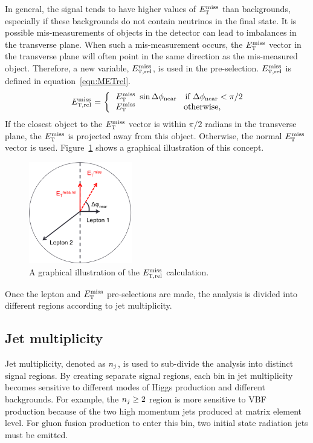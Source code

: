 In general, the signal tends to have higher values of $E_{\textrm{\footnotesize\sc t}}^{\rm miss}$ than backgrounds, especially if these backgrounds do not contain neutrinos in the final state. It is possible mis-measurements of objects in the detector can lead to imbalances in the transverse plane. When such a mis-measurement occurs, the $E_{\textrm{\footnotesize\sc t}}^{\rm miss}$ vector in the transverse plane will often point in the same direction as the mis-measured object. Therefore, a new variable, $E_{{\textrm{\footnotesize\sc t}},{\rm rel}}^{\rm miss}$, is used in the pre-selection. $E_{{\textrm{\footnotesize\sc t}},{\rm rel}}^{\rm miss}$ is defined in equation~\ref{eqn:METrel}. 
%
\begin{equation}
  \begin{array}{ll}
  \multirow{2}{*}{$\METrel$ =\ \bigg\{ }
    &\!\!\!\!\MET\ \sin\dphiNear\quad\textrm{if $\dphiNear<\pi/2$}\\
    &\!\!\!\!\MET\ \phantom{\sin\dphiNear}\quad\textrm{otherwise,}
  \end{array}
\label{eqn:METrel}
\end{equation}
%
If the closest object to the $E_{\textrm{\footnotesize\sc t}}^{\rm miss}$ vector is within $\pi/2$ radians in the transverse plane, the $E_{\textrm{\footnotesize\sc t}}^{\rm miss}$ is projected away from this object. Otherwise, the normal $E_{\textrm{\footnotesize\sc t}}^{\rm miss}$ vector is used. Figure~\ref{fig:METrel} shows a graphical illustration of this concept. 
%
\begin{figure}[h!]
  \centering
  \captionsetup{justification=centering}

  \includegraphics[width=0.4\textwidth]{figures/METrel_cartoon}
  \caption{A graphical illustration of the $E_{{\textrm{\footnotesize\sc t}},{\rm rel}}^{\rm miss}$ calculation.}
  \label{fig:METrel}
\end{figure}

Once the lepton and $E_{\textrm{\footnotesize\sc t}}^{\rm miss}$ pre-selections are made, the analysis is divided into different regions according to jet multiplicity.

\subsection{Jet multiplicity}
\label{sec:jetmult}
Jet multiplicity, denoted as $n_j$, is used to sub-divide the analysis into distinct signal regions. By creating separate signal regions, each bin in jet multiplicity becomes sensitive to different modes of Higgs production and different backgrounds. For example, the $n_j \geq 2$ region is more sensitive to VBF production because of the two high momentum jets produced at matrix element level. For gluon fusion production to enter this bin, two initial state radiation jets must be emitted. 

